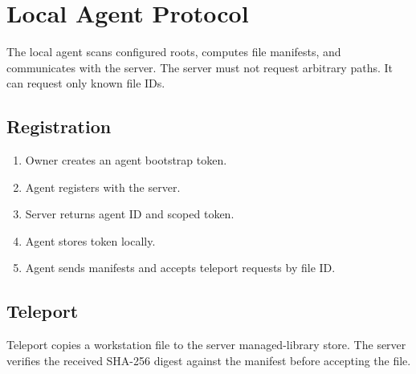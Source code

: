 \section{Local Agent Protocol}

The local agent scans configured roots, computes file manifests, and communicates with the server. The server must not request arbitrary paths. It can request only known file IDs.

\subsection{Registration}

\begin{enumerate}[noitemsep]
  \item Owner creates an agent bootstrap token.
  \item Agent registers with the server.
  \item Server returns agent ID and scoped token.
  \item Agent stores token locally.
  \item Agent sends manifests and accepts teleport requests by file ID.
\end{enumerate}

\subsection{Teleport}

Teleport copies a workstation file to the server managed-library store. The server verifies the received SHA-256 digest against the manifest before accepting the file.
